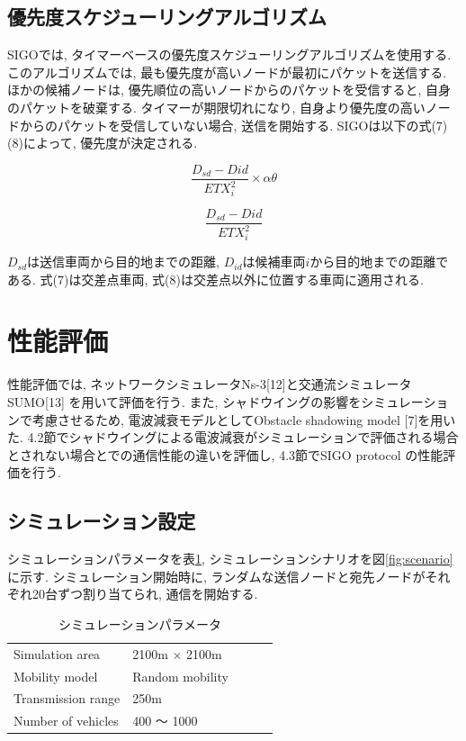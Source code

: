 \documentclass[technicalreport]{ieicej}
\begin{document}
\subsection{優先度スケジューリングアルゴリズム}
SIGOでは, タイマーベースの優先度スケジューリングアルゴリズムを使用する. このアルゴリズムでは, 最も優先度が高いノードが最初にパケットを送信する. ほかの候補ノードは, 優先順位の高いノードからのパケットを受信すると, 自身のパケットを破棄する. タイマーが期限切れになり, 自身より優先度の高いノードからのパケットを受信していない場合, 送信を開始する. SIGOは以下の式(7)(8)によって, 優先度が決定される.

\begin{equation}
\frac{D_{sd} - D{id}}{ETX_{i}^{2}} \times αθ
\end{equation}

\begin{equation}
\frac{D_{sd} - D{id}}{ETX_{i}^{2}} 
\end{equation}

$D_{sd}$は送信車両から目的地までの距離, $D_{id}$は候補車両$i $から目的地までの距離である. 式(7)は交差点車両, 式(8)は交差点以外に位置する車両に適用される.

\section{性能評価}
性能評価では, ネットワークシミュレータNs-3[12]と交通流シミュレータSUMO[13] を用いて評価を行う. また, シャドウイングの影響をシミュレーションで考慮させるため, 電波減衰モデルとしてObstacle shadowing model [7]を用いた. 4.2節でシャドウイングによる電波減衰がシミュレーションで評価される場合とされない場合とでの通信性能の違いを評価し, 4.3節でSIGO protocol の性能評価を行う.

\subsection{シミュレーション設定}
シミュレーションパラメータを表\ref{tab:parameter}, シミュレーションシナリオを図\ref{fig:scenario}に示す. シミュレーション開始時に, ランダムな送信ノードと宛先ノードがそれぞれ20台ずつ割り当てられ, 通信を開始する. 
\begin{table}[!ht]
\begin{center}
\caption{シミュレーションパラメータ}
\label{tab:parameter}
\begin{tabular}{|l|l|lll}
\cline{1-2}
Simulation area    & 2100m × 2100m   &  &  &  \\ \cline{1-2}
Mobility model     & Random mobility &  &  &  \\ \cline{1-2}
Transmission range & 250m            &  &  &  \\ \cline{1-2}
Number of vehicles & 400 ～ 1000      &  &  &  \\ \cline{1-2}
\end{tabular}
\end{center}
\end{table}
\end{document}
